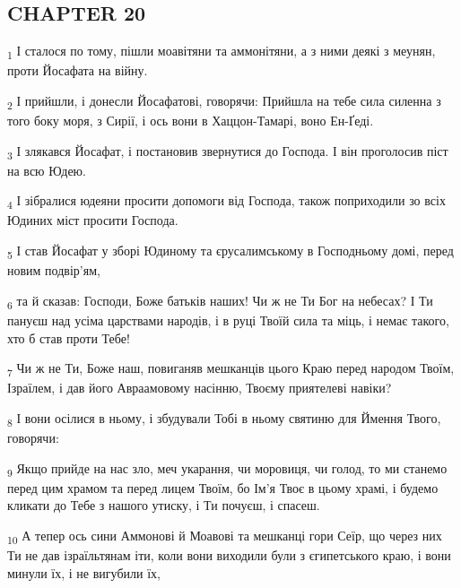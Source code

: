 \subsection{CHAPTER 20}
\begin{tcolorbox}
\textsubscript{1} І сталося по тому, пішли моавітяни та аммонітяни, а з ними деякі з меунян, проти Йосафата на війну.
\end{tcolorbox}
\begin{tcolorbox}
\textsubscript{2} І прийшли, і донесли Йосафатові, говорячи: Прийшла на тебе сила силенна з того боку моря, з Сирії, і ось вони в Хаццон-Тамарі, воно Ен-Ґеді.
\end{tcolorbox}
\begin{tcolorbox}
\textsubscript{3} І злякався Йосафат, і постановив звернутися до Господа. І він проголосив піст на всю Юдею.
\end{tcolorbox}
\begin{tcolorbox}
\textsubscript{4} І зібралися юдеяни просити допомоги від Господа, також поприходили зо всіх Юдиних міст просити Господа.
\end{tcolorbox}
\begin{tcolorbox}
\textsubscript{5} І став Йосафат у зборі Юдиному та єрусалимському в Господньому домі, перед новим подвір'ям,
\end{tcolorbox}
\begin{tcolorbox}
\textsubscript{6} та й сказав: Господи, Боже батьків наших! Чи ж не Ти Бог на небесах? І Ти пануєш над усіма царствами народів, і в руці Твоїй сила та міць, і немає такого, хто б став проти Тебе!
\end{tcolorbox}
\begin{tcolorbox}
\textsubscript{7} Чи ж не Ти, Боже наш, повиганяв мешканців цього Краю перед народом Твоїм, Ізраїлем, і дав його Авраамовому насінню, Твоєму приятелеві навіки?
\end{tcolorbox}
\begin{tcolorbox}
\textsubscript{8} І вони осілися в ньому, і збудували Тобі в ньому святиню для Ймення Твого, говорячи:
\end{tcolorbox}
\begin{tcolorbox}
\textsubscript{9} Якщо прийде на нас зло, меч укарання, чи моровиця, чи голод, то ми станемо перед цим храмом та перед лицем Твоїм, бо Ім'я Твоє в цьому храмі, і будемо кликати до Тебе з нашого утиску, і Ти почуєш, і спасеш.
\end{tcolorbox}
\begin{tcolorbox}
\textsubscript{10} А тепер ось сини Аммонові й Моавові та мешканці гори Сеїр, що через них Ти не дав ізраїльтянам іти, коли вони виходили були з єгипетського краю, і вони минули їх, і не вигубили їх,
\end{tcolorbox}
